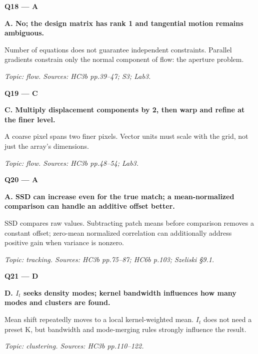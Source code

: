 \documentclass[11pt,a4paper]{article}
\begin{document}
\par\vspace{12pt}
\begin{minipage}{\linewidth}
\textbf{Q18 — A}\par\smallskip
\textbf{A. No; the design matrix has rank 1 and tangential motion remains ambiguous.}\par
Number of equations does not guarantee independent constraints. Parallel gradients constrain only the normal component of flow: the aperture problem.\par
{\small\itshape Topic: flow. Sources: HC3b pp.39–47; S3; Lab3.}

\end{minipage}
\par\vspace{12pt}
\begin{minipage}{\linewidth}
\textbf{Q19 — C}\par\smallskip
\textbf{C. Multiply displacement components by 2,\allowbreak{} then warp and refine at the finer level.}\par
A coarse pixel spans two finer pixels. Vector units must scale with the grid,\allowbreak{} not just the array's dimensions.\par
{\small\itshape Topic: flow. Sources: HC3b pp.48–54; Lab3.}

\end{minipage}
\par\vspace{12pt}
\begin{minipage}{\linewidth}
\textbf{Q20 — A}\par\smallskip
\textbf{A. SSD can increase even for the true match; a mean-normalized comparison can handle an additive offset better.}\par
SSD compares raw values. Subtracting patch means before comparison removes a constant offset; zero-mean normalized correlation can additionally address positive gain when variance is nonzero.\par
{\small\itshape Topic: tracking. Sources: HC3b pp.75–87; HC6b p.103; Szeliski §9.1.}

\end{minipage}
\par\vspace{12pt}
\begin{minipage}{\linewidth}
\textbf{Q21 — D}\par\smallskip
\textbf{D. \(I_t\) seeks density modes; kernel bandwidth influences how many modes and clusters are found.}\par
Mean shift repeatedly moves to a local kernel-weighted mean. \(I_t\) does not need a preset K,\allowbreak{} but bandwidth and mode-merging rules strongly influence the result.\par
{\small\itshape Topic: clustering. Sources: HC3b pp.110–122.}

\end{minipage}
\end{document}
